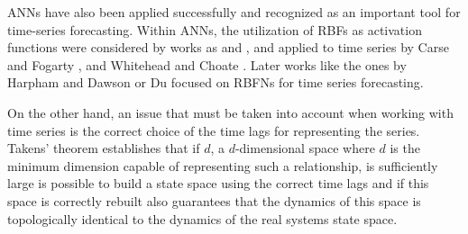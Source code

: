 \documentclass[a4paper,twoside]{article}
\begin{document}

ANNs have also been applied successfully \cite{Jain2007}%
and recognized as an important tool for time-series forecasting. %
Within ANNs, the utilization of RBFs as activation functions were
considered by works as \cite{Broomhead88} and \cite{Rivas04}, and
applied to time series by Carse and Fogarty \cite{Carse1996}, and
Whitehead and Choate \cite{Whitehead96}. Later works like the ones by
Harpham and Dawson \cite{Harpham06} or  Du \cite{Du2008} focused on
RBFNs for time series forecasting. %


On the other hand, an issue that must be taken into account when
working with time series is the correct choice of the time lags for
representing the series. Takens' theorem \cite{Takens1980} establishes
that if $d$, a $d$-dimensional space where $d$ is the minimum
dimension capable of representing such a relationship, is sufficiently
large is possible to build a state space using the correct time lags
and if this space is correctly rebuilt also guarantees that the
dynamics of this space is topologically identical to the dynamics of
the real systems state space. 
\end{document}

